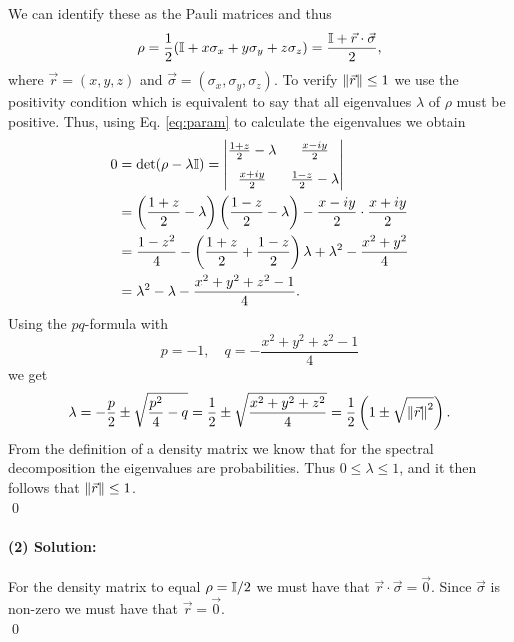 We can identify these as the Pauli matrices and thus
\begin{equation}
    \rho = \frac{1}{2} (\mathbb{I} + x\sigma_x + y \sigma_y + z\sigma_z) = \frac{\mathbb{I} + \vec{r}\cdot \vec{\sigma}}{2},
\end{equation}
where $\vec{r} = (x,y,z)$ and $\vec{\sigma} =(\sigma_x,\sigma_y,\sigma_z)$. To verify $\norm{\vec{r}} \leq 1$ we use the positivity condition which is equivalent to say that all eigenvalues $\lambda$ of $\rho$ must be positive. Thus, using Eq. \eqref{eq:param} to calculate the eigenvalues we obtain
{\everymath{\displaystyle}
\begin{align}
    0 &= \det (\rho - \lambda \mathbb{I}) = 
    \begin{vmatrix}
        \frac{1 + z}{2} - \lambda & \frac{x - iy}{2}\\[8pt]
        \frac{x + iy}{2} & \frac{1- z}{2} - \lambda
    \end{vmatrix} \\
    &= \left(\frac{1 + z}{2} - \lambda\right) \left(\frac{1- z}{2} - \lambda\right) - \frac{x -iy}{2} \cdot \frac{x + iy}{2}\\
    &= \frac{1- z^2}{4} -\left( \frac{1 + z}{2} + \frac{1-z}{2} \right)\lambda + \lambda^2 - \frac{x^2 + y^2}{4}\\
    &= \lambda^2 - \lambda - \frac{x^2 + y^2 + z^2 - 1}{4}.
\end{align}}
Using the $pq$-formula with
\begin{equation}
    p = -1, \quad q = - \frac{x^2 + y^2 + z^2 - 1}{4}
\end{equation}
we get
\begin{equation}
    \lambda = -\frac{p}{2} \pm \sqrt{\frac{p^2}{4} - q} = \frac{1}{2} \pm \sqrt{\frac{x^2 + y^2 + z^2}{4}} = \frac{1}{2} \left(1 \pm \sqrt{\norm{\vec{r}}^2} \right).\label{eq:pq}
\end{equation}
From the definition of a density matrix we know that for the spectral decomposition the eigenvalues are probabilities. Thus $0 \leq \lambda \leq 1$, and it then follows that $\norm{\vec{r}} \leq 1$.\\
\qed

\paragraph{(2) Solution:} For the density matrix to equal $\rho = \mathbb{I} / 2$ we must have that $\vec{r} \cdot \vec{\sigma} = \vec{0}$. Since $\vec{\sigma}$ is non-zero we must have that $\vec{r} = \vec{0}$.\\\qed

